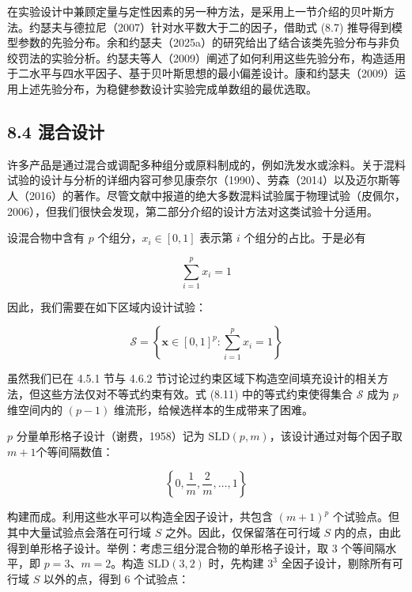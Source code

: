 \documentclass{ctexart}
\begin{document}
在实验设计中兼顾定量与定性因素的另一种方法，是采用上一节介绍的贝叶斯方法。约瑟夫与德拉尼（2007）针对水平数大于二的因子，借助式 (8.7) 推导得到模型参数的先验分布。余和约瑟夫（2025a）的研究给出了结合该类先验分布与非负绞罚法的实验分析。约瑟夫等人（2009）阐述了如何利用这些先验分布，构造适用于二水平与四水平因子、基于贝叶斯思想的最小偏差设计。康和约瑟夫（2009）运用上述先验分布，为稳健参数设计实验完成单数组的最优选取。

\subsection*{8.4 混合设计}

许多产品是通过混合或调配多种组分或原料制成的，例如洗发水或涂料。关于混料试验的设计与分析的详细内容可参见康奈尔（1990）、劳森（2014）以及迈尔斯等人（2016）的著作。尽管文献中报道的绝大多数混料试验属于物理试验（皮佩尔，2006），但我们很快会发现，第二部分介绍的设计方法对这类试验十分适用。

设混合物中含有 $p$ 个组分，$x_i\in[0,1]$ 表示第 $i$ 个组分的占比。于是必有

\begin{equation*}
\sum_{i=1}^{p}x_i=1
\tag{8.11}
\end{equation*}

因此，我们需要在如下区域内设计试验：

\begin{equation*}
\mathcal{S}=\left\{\boldsymbol{x}\in[0,1]^p:\sum_{i=1}^{p}x_i=1\right\}
\end{equation*}

虽然我们已在 4.5.1 节与 4.6.2 节讨论过约束区域下构造空间填充设计的相关方法，但这些方法仅对不等式约束有效。式 (8.11) 中的等式约束使得集合 $\mathcal{S}$ 成为 $p$ 维空间内的 $(p-1)$ 维流形，给候选样本的生成带来了困难。

$p$ 分量单形格子设计（谢费，1958）记为 $\mathrm{SLD}(p,m)$，该设计通过对每个因子取 $m+1$个等间隔数值：

\begin{equation*}
\left\{0,\frac{1}{m},\frac{2}{m},\dots,1\right\}
\end{equation*}

构建而成。利用这些水平可以构造全因子设计，共包含 $(m+1)^p$ 个试验点。但其中大量试验点会落在可行域 $S$ 之外。因此，仅保留落在可行域 $S$ 内的点，由此得到单形格子设计。举例：考虑三组分混合物的单形格子设计，取 3 个等间隔水平，即 $p=3$、$m=2$。构造 $\mathrm{SLD}(3,2)$ 时，先构建 $3^3$ 全因子设计，剔除所有可行域 $S$ 以外的点，得到 6 个试验点：
\end{document}
